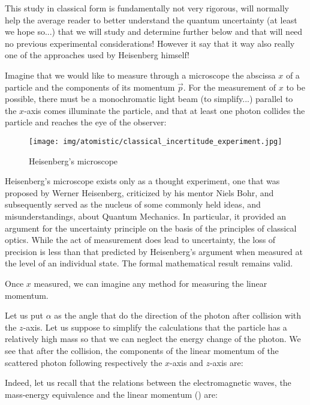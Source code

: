 	This study in classical form is fundamentally not very rigorous, will normally help the average reader to better understand the quantum uncertainty (at least we hope so...) that we will study and determine further below and that will need no previous experimental considerations! However it say that it way also really one of the approaches used by Heisenberg himself!
	
	Imagine that we would like to measure through a microscope the abscissa $x$ of a particle and the components of its momentum $\vec{p}$. For the measurement of $x$ to be possible, there must be a monochromatic light beam (to simplify...) parallel to the $x$-axis comes illuminate the particle, and that at least one photon collides the particle and reaches the eye of the observer: 
	\begin{figure}[H]
		\centering
		\texttt{[image: img/atomistic/classical\_incertitude\_experiment.jpg]}
		\caption{Heisenberg's microscope}
	\end{figure}
	\begin{tcolorbox}[title=Remark,colframe=black,arc=10pt]
	Heisenberg's microscope exists only as a thought experiment, one that was proposed by Werner Heisenberg, criticized by his mentor Niels Bohr, and subsequently served as the nucleus of some commonly held ideas, and misunderstandings, about Quantum Mechanics. In particular, it provided an argument for the uncertainty principle on the basis of the principles of classical optics. While the act of measurement does lead to uncertainty, the loss of precision is less than that predicted by Heisenberg's argument when measured at the level of an individual state. The formal mathematical result remains valid.
	\end{tcolorbox}
	Once $x$ measured, we can imagine any method for measuring the linear momentum.

	Let us put $\alpha$ as the angle that do the direction of the photon after collision with the $z$-axis. Let us suppose to simplify the calculations that the particle has a relatively high mass so that we can neglect the energy change of the photon. We see that after the collision, the components of the linear momentum of the scattered photon following respectively the $x$-axis and $z$-axis are:
	
	Indeed, let us recall that the relations between the electromagnetic waves, the mass-energy equivalence and the linear momentum () are:
	
